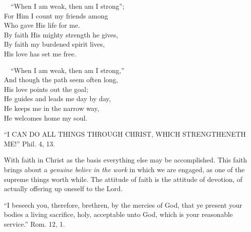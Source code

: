 \documentclass[
]{book}
\begin{document}
~~``When I am weak, then am I strong'';\\
\hspace*{0.333em}\hspace*{0.333em}For Him I count my friends among\\
\hspace*{0.333em}\hspace*{0.333em}Who gave His life for me.\\
\hspace*{0.333em}\hspace*{0.333em}By faith His mighty strength he gives,\\
\hspace*{0.333em}\hspace*{0.333em}By faith my burdened spirit lives,\\
\hspace*{0.333em}\hspace*{0.333em}His love has set me free.

~~``When I am weak, then am I strong,''\\
\hspace*{0.333em}\hspace*{0.333em}And though the path seem often long,\\
\hspace*{0.333em}\hspace*{0.333em}His love points out the goal;\\
\hspace*{0.333em}\hspace*{0.333em}He guides and leads me day by day,\\
\hspace*{0.333em}\hspace*{0.333em}He keeps me in the narrow way,\\
\hspace*{0.333em}\hspace*{0.333em}He welcomes home my soul.

``I CAN DO ALL THINGS THROUGH CHRIST, WHICH STRENGTHENETH ME!'' Phil. 4, 13.

With faith in Christ as the basis everything else may be accomplished. This faith brings about a \emph{genuine believ in the work} in which we are engaged, as one of the supreme things worth while. The attitude of faith is the attitude of devotion, of actually offering up oneself to the Lord.

``I beseech you, therefore, brethren, by the mercies of God, that ye present your bodies a living sacrifice, holy, acceptable unto God, which is your reasonable service.'' Rom. 12, 1.
\end{document}
